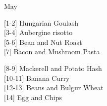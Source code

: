 		\begin{menu}{May}
    
    \begin{recipelist}
    
        {\scriptsize[1-2]} Hungarian Goulash\\
        {\scriptsize[3-4]} Aubergine risotto\\
        {\scriptsize[5-6]} Bean and Nut Roast\\
        {\scriptsize[7]} Bacon and Mushroom Pasta\\%
    \end{recipelist}%
    \begin{recipelist}
    
        {\scriptsize[8-9]} Mackerell and Potato Hash\\
        {\scriptsize[10-11]} Banana Curry\\
        {\scriptsize[12-13]} Beans and Bulgur Wheat\\
        {\scriptsize[14]} Egg and Chips\\%
    \end{recipelist}\par%
  

\end{menu}
